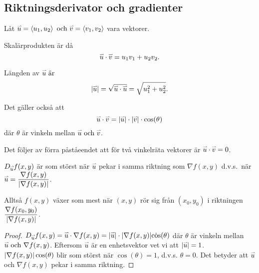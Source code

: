 \documentclass[a4paper]{article}
\begin{document}
\providecommand\fname{}
\renewcommand\fname{19-09-13}

\subsection{Riktningsderivator och gradienter}
\begin{påm}
    Låt \(
        \accentset{\rightharpoonup}{u} = \left\langle u_1, u_2\right\rangle \text{ och } \accentset{\rightharpoonup}{v} = \left\langle v_1, v_2\right\rangle
    \) vara vektorer.

    Skalärprodukten är då \[
        \accentset{\rightharpoonup}{u} \cdot \accentset{\rightharpoonup}{v} = u_1v_1 + u_2v_2.
    \]

    Längden av \(
        \accentset{\rightharpoonup}{u} \text{ är } \)
        \[\abs{\accentset{\rightharpoonup}{u} } = \sqrt{\accentset{\rightharpoonup}{u} \cdot \accentset{\rightharpoonup}{u} } = \sqrt{u_1^2 + u_2^2}.\]
    

    Det gäller också att \[
        \accentset{\rightharpoonup}{u} \cdot \accentset{\rightharpoonup}{v} = \abs{\accentset{\rightharpoonup}{u} } \cdot \abs{\accentset{\rightharpoonup}{v} } \cdot \cos(\theta)
    \] där \(
        \theta
    \) är vinkeln mellan \(
        \accentset{\rightharpoonup}{u} \text{ och } \accentset{\rightharpoonup}{v} 
    \).

    Det följer av förra påståeendet att för två vinkelräta vektorer är \(
        \accentset{\rightharpoonup}{u} \cdot \accentset{\rightharpoonup}{v} = 0
    \).
\end{påm}

\begin{sats}
    \(
        D_{\accentset{\rightharpoonup}{u}} f(x,y)
    \) är som störst när \(
        \accentset{\rightharpoonup}{u} 
    \) pekar i samma riktning som \(
        \nabla f(x,y)
    \) d.v.s.\ när \(
        \accentset{\rightharpoonup}{u} = \displaystyle\frac{\nabla f(x,y)}{\abs{\nabla f(x,y)}} 
    \).

Alltså \(
    f(x,y)
\) växer som mest när \(
    (x,y)
\) rör sig från \(
    (x_0, y_0)
\) i riktningen \(
    \displaystyle\frac{\nabla f(x_0, y_0)}{\abs{\nabla f(x,y)}}
\).

\begin{proof}
    \(
        D_{\accentset{\rightharpoonup}{u}} f(x,y) = \accentset{\rightharpoonup}{u} \cdot \nabla f(x,y) 
        = \abs{\accentset{\rightharpoonup}{u}} \cdot \abs{\nabla f(x,y)} \dot \cos(\theta)
    \) där \(
        \theta
    \) är vinkeln mellan \(
        \accentset{\rightharpoonup}{u} \text{ och } \nabla f(x,y)
    \). Eftersom \(
        \accentset{\rightharpoonup}{u}
    \) är en enhetsvektor vet vi att \(
        \abs{\accentset{\rightharpoonup}{u}} = 1
    \). \(
        \abs{\nabla f(x,y)} \cos(\theta)
    \) blir som störst när \(
        \cos(\theta) = 1
    \), d.v.s. \(
        \theta = 0
    \). Det betyder att \(
        \accentset{\rightharpoonup}{u}
    \) och \(
        \nabla f(x,y)
    \) pekar i samma riktning.
\end{proof}
\end{sats}
\end{document}
